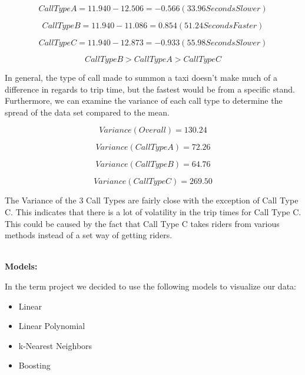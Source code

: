 \documentclass[11pt]{article}
\begin{document}
\begin{equation}
Call Type A = 11.940 - 12.506 = -0.566 (33.96 Seconds Slower)
\end{equation}

\begin{equation}
Call Type B = 11.940 - 11.086 = 0.854(51.24 Seconds Faster)
\end{equation}

\begin{equation}
Call Type C = 11.940 - 12.873 = -0.933 (55.98 Seconds Slower)
\end{equation}

\begin{equation}
Call Type B >Call Type A > Call Type C
\end{equation}

\par
In general, the type of call made to summon a taxi doesn’t make much of a difference in regards to trip time, but the fastest would be from a specific stand. Furthermore, we can examine the variance of each call type to determine the spread of the data set compared to the mean.

\begin{equation}
Variance (Overall) = 130.24
\end{equation}

\begin{equation}
Variance (Call Type A) = 72.26
\end{equation}

\begin{equation}
Variance (Call Type B) = 64.76
\end{equation}

\begin{equation}
Variance (Call Type C) = 269.50
\end{equation}

\par
The Variance of the 3 Call Types are fairly close with the exception of Call Type C. This indicates that there is a lot of volatility in the trip times for Call Type C. This could be caused by the fact that Call Type C takes riders from various methods instead of a set way of getting riders.

\\
\textbf{Models:}
\par
In the term project we decided to use the following models to visualize our data:
\begin{itemize}
	\item Linear
	\item Linear Polynomial
	\item k-Nearest Neighbors
	\item Boosting
\end{itemize}
\end{document}
